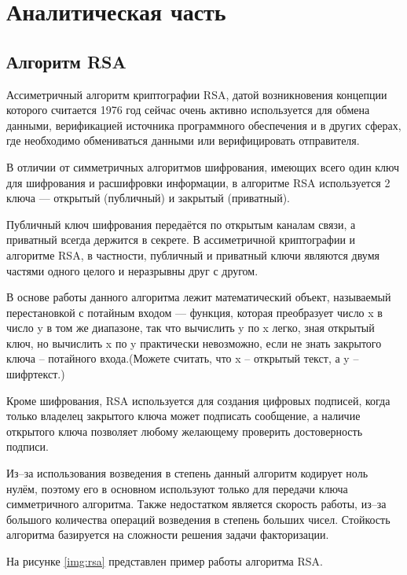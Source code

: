 \chapter{Аналитическая часть}

\section{Алгоритм RSA}

Ассиметричный алгоритм криптографии RSA, датой возникновения концепции которого считается 1976 год сейчас очень активно используется для обмена данными, верификацией источника программного обеспечения и в других сферах, где необходимо обмениваться данными или верифицировать отправителя.

В отличии от симметричных алгоритмов шифрования, имеющих всего один ключ для шифрования и расшифровки информации, в алгоритме RSA используется 2 ключа --- открытый (публичный) и закрытый (приватный).

Публичный ключ шифрования передаётся по открытым каналам связи, а приватный всегда держится в секрете. В ассиметричной криптографии и алгоритме RSA, в частности, публичный и приватный ключи являются двумя частями одного целого и неразрывны друг с другом.

В основе работы данного алгоритма лежит математический объект, называемый перестановкой с потайным входом --- функция, которая преобразует число x в число y в том же диапазоне, так что вычислить y по x легко, зная открытый ключ, но вычислить x по y практически невозможно, если не знать закрытого ключа -- потайного входа.(Можете считать, что x – открытый текст, а y – шифртекст.)

Кроме шифрования, RSA используется для создания цифровых подписей, когда только владелец закрытого ключа может подписать сообщение, а наличие открытого ключа позволяет любому желающему проверить достоверность подписи. 

Из--за использования возведения в степень данный алгоритм кодирует ноль нулём, поэтому его в основном используют только для передачи ключа симметричного алгоритма. Также недостатком является скорость работы, из--за большого количества операций возведения в степень больших чисел. Стойкость алгоритма базируется на сложности решения задачи факторизации.
 
На рисунке \ref{img:rsa} представлен пример работы алгоритма RSA.

\FloatBarrier

